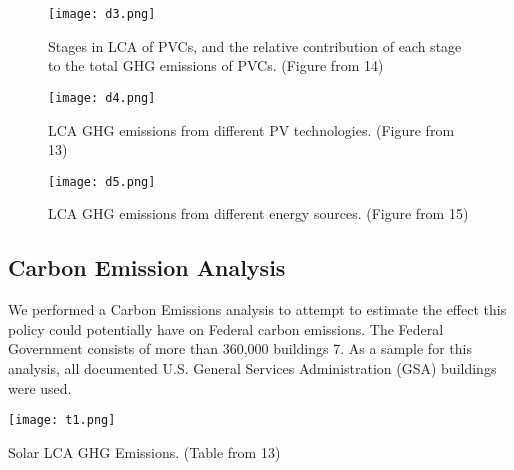 \documentclass[10pt]{book} %
\begin{document}
\begin{figure}
\begin{center}
\texttt{[image: d3.png]}
\caption{Stages in LCA of PVCs, and the relative contribution of each stage to the total GHG emissions of PVCs. (Figure from \cite{deb}{14})}
\label{d3}
\end{center}
\end{figure}

\begin{figure}
\begin{center}
\texttt{[image: d4.png]}
\caption{LCA GHG emissions from different PV technologies. (Figure from \cite{deb}{13})}
\label{d4}
\end{center}
\end{figure}

\begin{figure}
\begin{center}
\texttt{[image: d5.png]}
\caption{LCA GHG emissions from different energy sources. (Figure from \cite{deb}{15})}
\label{d5}
\end{center}
\end{figure}

\subsection{Carbon Emission Analysis}
We performed a Carbon Emissions analysis to attempt to estimate the effect this policy could potentially have on Federal carbon emissions. The Federal Government consists of more than 360,000 buildings \cite{deb}{7}. As a sample for this analysis, all documented U.S. General Services Administration (GSA) buildings were used.

\begin{table}
\begin{center}
\texttt{[image: t1.png]}
\caption{Solar LCA GHG Emissions. (Table from \cite{deb}{13})}
\label{t1}
\end{center}
\end{table}
\end{document}

